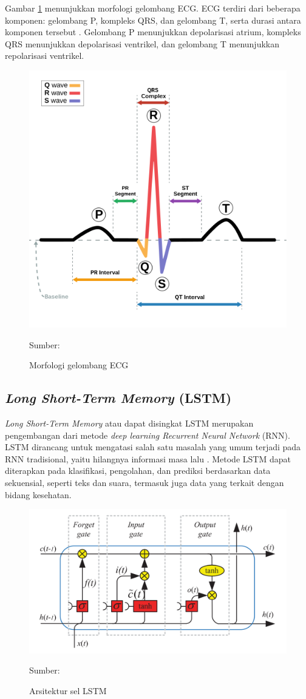 Gambar \ref{fig: ecg-morphology} menunjukkan morfologi gelombang ECG. ECG terdiri dari beberapa komponen: gelombang P, kompleks QRS, dan gelombang T, serta durasi antara komponen tersebut \parencite{anbalaganAnalysisVariousTechniques2023}.  Gelombang P menunjukkan depolarisasi atrium, kompleks QRS menunjukkan depolarisasi ventrikel, dan gelombang T menunjukkan repolarisasi ventrikel.

\begin{figure}[h!]
  \centering
  \includegraphics[width=.5\linewidth]{img/ecg-morphology.png}
  \caption{Morfologi gelombang ECG}
  Sumber: \textcite{wiki:xxx}
  \label{fig: ecg-morphology}
\end{figure}

\subsection{\textit{Long Short-Term Memory} (LSTM)}
\label{subsec: landasan-lstm}

\textit{Long Short-Term Memory} atau dapat disingkat LSTM merupakan pengembangan dari metode \textit{deep learning Recurrent Neural Network} (RNN). LSTM dirancang untuk mengatasi salah satu masalah yang umum terjadi pada RNN tradisional, yaitu hilangnya informasi masa lalu \parencite{hochreiterLongShorttermMemory1997}. Metode LSTM dapat diterapkan pada klasifikasi, pengolahan, dan prediksi berdasarkan data sekuensial, seperti teks dan suara,  termasuk juga data yang terkait dengan bidang kesehatan.

\begin{figure}[H]
  \centering
  \includegraphics[width=.7\linewidth]{img/ecg-arch.png}
  \caption{Arsitektur sel LSTM}
  Sumber: \textcite{yuReviewRecurrentNeural2019}
  \label{fig:arsitektur-lstm}
\end{figure}

